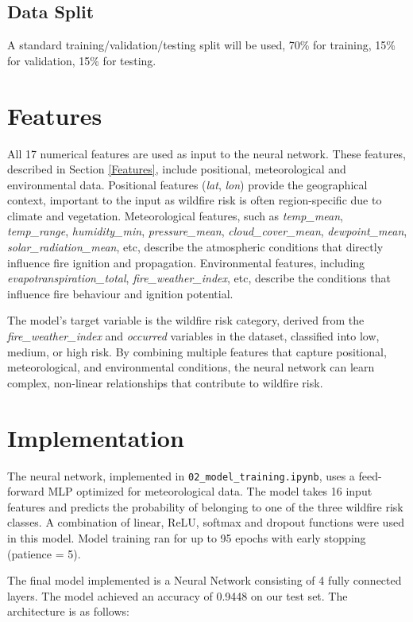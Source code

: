 \documentclass[11pt]{article}
\begin{document}
\subsection{Data Split}
A standard training/validation/testing split will be used, 70\% for training, 15\% for validation, 15\% for testing.

\section{Features}

All 17 numerical features are used as input to the neural network. These features, described in Section \ref{Features}, include positional, meteorological and environmental data.
Positional features (\textit{lat}, \textit{lon}) provide the geographical context, important to the input as wildfire risk is often region-specific due to climate and vegetation.
Meteorological features, such as \textit{temp\_mean}, \textit{temp\_range}, \textit{humidity\_min}, \textit{pressure\_mean}, \textit{cloud\_cover\_mean}, \textit{dewpoint\_mean}, \textit{solar\_radiation\_mean}, etc,
describe the atmospheric conditions that directly influence fire ignition and propagation. Environmental features, including \textit{evapotranspiration\_total}, \textit{fire\_weather\_index}, etc, describe the conditions
that influence fire behaviour and ignition potential. 

The model's target variable is the wildfire risk category, derived from the \textit{fire\_weather\_index} and \textit{occurred} variables in the dataset,
classified into low, medium, or high risk. By combining multiple features that capture positional, meteorological, and environmental conditions, the neural network can learn complex, non-linear relationships 
that contribute to wildfire risk. 

\section{Implementation}

The neural network, implemented in \texttt{02\_model\_training.ipynb}, uses a feed-forward MLP optimized for meteorological data. The model takes 16 input features and predicts the probability of belonging to one of the three wildfire risk classes. A combination of linear, ReLU, softmax and dropout functions were used in this model. Model training ran for up to 95 epochs with early stopping (patience = 5).

The final model implemented is a Neural Network consisting of 4 fully connected layers. The model achieved an accuracy of 0.9448 on our test set. The architecture is as follows:
\end{document}
